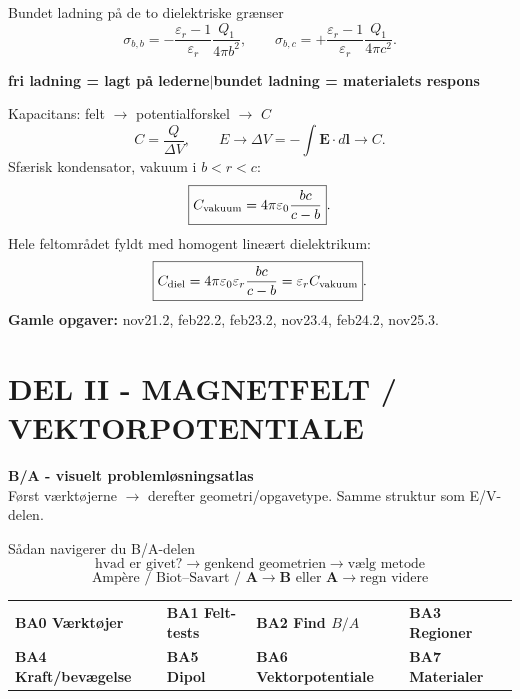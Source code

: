 \documentclass[10pt,a4paper]{article}
\begin{document}
\begin{casebox}{Bundet ladning på de to dielektriske grænser}
\[
 \boxed{\sigma_{b,b}=-\frac{\varepsilon_r-1}{\varepsilon_r}\frac{Q_1}{4\pi b^2}},
 \qquad
 \boxed{\sigma_{b,c}=+\frac{\varepsilon_r-1}{\varepsilon_r}\frac{Q_1}{4\pi c^2}}.
\]
\begin{center}
\textbf{fri ladning = lagt på lederne}\qquad$\big|$\qquad\textbf{bundet ladning = materialets respons}
\end{center}
\end{casebox}

\begin{casebox}{Kapacitans: felt $\to$ potentialforskel $\to$ $C$}
\[
 \boxed{C=\frac{Q}{\Delta V}},\qquad
 \boxed{E\to\Delta V=-\int\mathbf E\cdot d\mathbf l\to C}.
\]
Sfærisk kondensator, vakuum i $b<r<c$:
\[
 \boxed{C_{\rm vakuum}=4\pi\varepsilon_0\frac{bc}{c-b}}.
\]
Hele feltområdet fyldt med homogent lineært dielektrikum:
\[
 \boxed{C_{\rm diel}=4\pi\varepsilon_0\varepsilon_r\frac{bc}{c-b}=\varepsilon_rC_{\rm vakuum}}.
\]
\textbf{Gamle opgaver:} nov21.2, feb22.2, feb23.2, nov23.4, feb24.2, nov25.3.
\end{casebox}

\newpage
\setcounter{section}{4}

\section*{DEL II - MAGNETFELT / VEKTORPOTENTIALE}
{}
\begin{center}
{\Large\bfseries B/A - visuelt problemløsningsatlas}\\[1mm]
{\small Først værktøjerne $\to$ derefter geometri/opgavetype. Samme struktur som E/V-delen.}
\end{center}
\begin{quickbox}{Sådan navigerer du B/A-delen}
\[
\boxed{\text{hvad er givet?}}\to
\boxed{\text{genkend geometrien}}\to
\boxed{\text{vælg metode}}
\]
\[
\boxed{\text{Ampère / Biot--Savart / }\mathbf A}
\to
\boxed{\mathbf B\text{ eller }\mathbf A}
\to
\boxed{\text{regn videre}}
\]
\begin{center}
\begin{tabular}{llll}
\textbf{BA0 Værktøjer} & \textbf{BA1 Felt-tests} & \textbf{BA2 Find $B/A$} & \textbf{BA3 Regioner}\\
\textbf{BA4 Kraft/bevægelse} & \textbf{BA5 Dipol} & \textbf{BA6 Vektorpotentiale} & \textbf{BA7 Materialer}
\end{tabular}
\end{center}
\end{quickbox}
\end{document}
